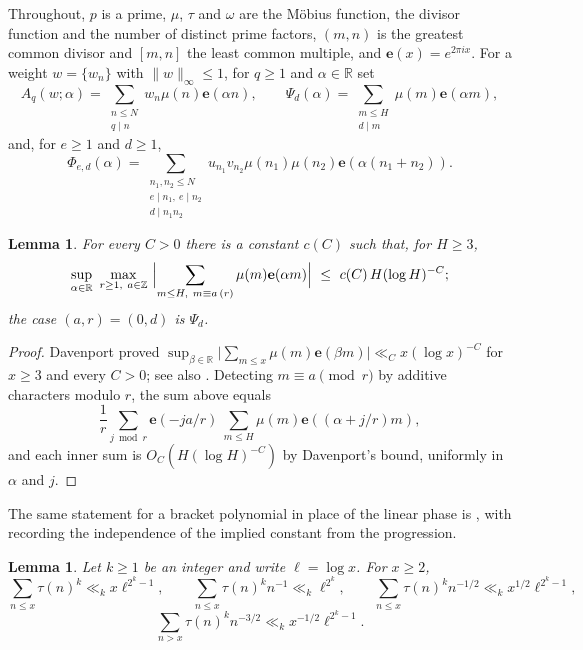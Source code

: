 \documentclass[11pt,a4paper]{article}
\theoremstyle{plain}
\newtheorem{lemma}[theorem]{Lemma}
\theoremstyle{remark}
\newcommand{\e}[1]{\mathbf{e}\!\left(#1\right)}
\newcommand{\lcm}[1]{[#1]}
\begin{document}
Throughout, $p$ is a prime, $\mu$, $\tau$ and $\omega$ are the M\"obius function, the divisor function
and the number of distinct prime factors, $(m,n)$ is the greatest common divisor and $\lcm{m,n}$ the
least common multiple, and $\e{x}=e^{2\pi ix}$. For a weight $w=\{w_n\}$ with $\|w\|_\infty\le1$, for
$q\ge 1$ and $\alpha\in\mathbb R$ set
\begin{equation}\label{eq:gens}
  A_q(w;\alpha)=\sum_{\substack{n\le N\\ q\mid n}}w_n\mu(n)\e{\alpha n},
  \qquad
  \Psi_d(\alpha)=\sum_{\substack{m\le H\\ d\mid m}}\mu(m)\e{\alpha m},
\end{equation}
and, for $e\ge 1$ and $d\ge1$,
\begin{equation}\label{eq:Phi}
  \Phi_{e,d}(\alpha)=\sum_{\substack{n_1,n_2\le N\\ e\mid n_1,\ e\mid n_2\\ d\mid n_1n_2}}
  u_{n_1}v_{n_2}\mu(n_1)\mu(n_2)\e{\alpha(n_1+n_2)}.
\end{equation}

\begin{lemma}\label{lem:dav}
For every $C>0$ there is a constant $c(C)$ such that, for $H\ge3$,
\[
  \sup_{\alpha\in\mathbb R}\ \max_{r\ge1,\ a\in\mathbb Z}\
  \Bigl|\sum_{m\le H,\ m\equiv a\,(r)}\mu(m)\e{\alpha m}\Bigr|\ \le\ c(C)\,H(\log H)^{-C} ;
\]
the case $(a,r)=(0,d)$ is $\Psi_d$.
\end{lemma}

\begin{proof}
Davenport \cite{Dav} proved
$\sup_{\beta\in\mathbb R}\bigl|\sum_{m\le x}\mu(m)\e{\beta m}\bigr|\ll_C x(\log x)^{-C}$ for $x\ge3$
and every $C>0$; see also \cite[Thm.~13.10]{IK}. Detecting $m\equiv a\pmod r$ by additive characters
modulo $r$, the sum above equals
\[
  \frac1r\sum_{j\bmod r}\e{-ja/r}\ \sum_{m\le H}\mu(m)\e{(\alpha+j/r)m},
\]
and each inner sum is $O_C(H(\log H)^{-C})$ by Davenport's bound, uniformly in $\alpha$ and $j$.
\end{proof}

The same statement for a bracket polynomial in place of the linear phase is \cite[Lem.~3.1]{BS}, with
\cite[Rem.~3.2]{BS} recording the independence of the implied constant from the progression.

\begin{lemma}\label{lem:tau}
Let $k\ge1$ be an integer and write $\ell=\log x$. For $x\ge 2$,
\[
  \sum_{n\le x}\tau(n)^{k}\ll_k x\ell^{2^{k}-1},\qquad
  \sum_{n\le x}\tau(n)^{k}n^{-1}\ll_k \ell^{2^{k}},\qquad
  \sum_{n\le x}\tau(n)^{k}n^{-1/2}\ll_k x^{1/2}\ell^{2^{k}-1},
\]
\[
  \sum_{n>x}\tau(n)^{k}n^{-3/2}\ll_k x^{-1/2}\ell^{2^{k}-1}.
\]
\end{lemma}
\end{document}
